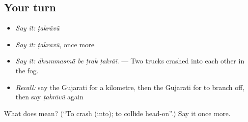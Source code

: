 \subsection*{Your turn}
\begin{itemize}
\raggedright
  \item \emph{Say it:} \emph{ṭakrāvũ}
  \item \emph{Say it:} \emph{ṭakrāvũ}, once more
  \item \emph{Say it:} \emph{dhummasmā̃ be ṭrak ṭakrāī.} — Two trucks crashed into each other in the fog.
  \item \emph{Recall:} say the Gujarati for a kilometre, then the Gujarati for to branch off, then say \emph{ṭakrāvũ} again
\end{itemize}

\begin{tcolorbox}[breakable,colback=teal!4,colframe=teal!35!black,title={Before you move on}]
What does  mean? (\textquotedblleft{}To crash (into); to collide head-on\textquotedblright{}.) Say it once more.
\end{tcolorbox}
